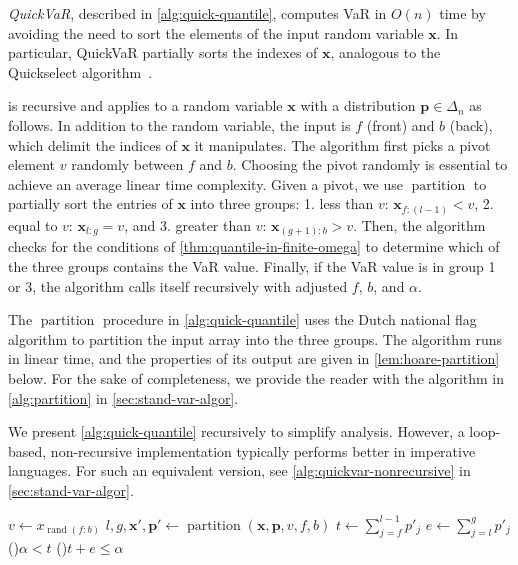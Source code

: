 \documentclass[10pt]{article} %
\DeclareMathOperator{\qvar}{QuickVaR}
\renewcommand{\cite}{\citep}
\begin{document}
\emph{QuickVaR}, described in \cref{alg:quick-quantile}, computes VaR in $O(n)$ time by avoiding the need to sort the elements of the input random variable $\bm{x}$. In particular, QuickVaR partially sorts the indexes of $\bm{x}$, analogous to the Quickselect algorithm~\cite{horowitz1998computer}. 

 is recursive and applies to a random variable $\bm{x}$ with a distribution $\bm{p}\in \Delta_n$ as follows. In addition to the random variable, the input is $f$ (front) and $b$ (back), which delimit the indices of $\bm{x}$ it manipulates.  The algorithm  first picks a pivot element $v$ randomly between $f$ and $b$. Choosing the pivot randomly is essential to achieve an average linear time complexity. Given a pivot, we use $\operatorname{partition}$ to partially sort the entries of $\bm{x}$ into three groups: 1. less than $v$: $\bm{x}_{f{:}(l-1)} < v$, 2. equal to $v$: $\bm{x}_{l{:}g} = v$, and 3. greater than $v$: $\bm{x}_{(g+1){:}b} > v$. Then, the algorithm checks for the conditions of \cref{thm:quantile-in-finite-omega} to determine which of the three groups contains the VaR value. Finally, if the VaR value is in group 1 or 3, the algorithm calls itself recursively with adjusted $f$, $b$, and $\alpha$.

The $\operatorname{partition}$ procedure in \cref{alg:quick-quantile} uses the Dutch national flag algorithm to partition the input array into the three groups. The algorithm runs in linear time, and the properties of its output are given in \cref{lem:hoare-partition} below. For the sake of completeness, we provide the reader with the algorithm in \cref{alg:partition} in \cref{sec:stand-var-algor}. 

We present \cref{alg:quick-quantile} recursively to simplify analysis. However, a loop-based, non-recursive implementation typically performs better in imperative languages. For such an equivalent version, see \cref{alg:quickvar-nonrecursive} in \cref{sec:stand-var-algor}.

\begin{algorithm}
  \caption{\texttt{QuickVaR}: Recursive VaR algorithm} \label{alg:quick-quantile}
  \Input{$\bm{x} \in \Real^n$, $\bm{p} \in \Delta_n$, $\alpha \in [0,1)$, $f, b \in 1{:}n$ such that $f \le  b$ and $\sum_{j=f}^b p_j > \alpha$}
  \Output{$\varo_{\alpha}[\tilde{x}]$}
  $v \gets x_{\operatorname{rand}(f{:}b)}$ 
  $l, g, \bm{x}', \bm{p}' \gets \operatorname{partition}(\bm{x}, \bm{p}, v, f, b)$
  \label{ln:t}
  $t \gets \sum_{j=f}^{l-1} p'_j$ 
  \label{ln:e}
  $e \gets \sum_{j=l}^{g} p'_j$  
  \label{ln:firstif}
  \If(){$\alpha < t$}{ 
    \KwRet{$\qvar(\bm{x}', \bm{p}', \alpha, f, l-1)$}
  }
  \label{ln:secondif}
  \ElseIf(){$t + e \le \alpha$}{
    \KwRet{$\qvar(\bm{x}', \bm{p}', \alpha - t - e, g+1, b)$}
  }
  \label{ln:thirdif}
\end{algorithm}
\end{document}
